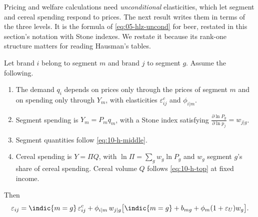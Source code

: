 Pricing and welfare calculations need \emph{unconditional} elasticities, which let segment and cereal
spending respond to prices. The next result writes them in terms of the three levels. It is the formula of
\eqref{eq:05-hlz-uncond} for beer, restated in this section's notation with Stone indexes. We restate it
because its rank-one structure matters for reading Hausman's tables.

\begin{proposition}\label{prop:10-elasticity-aggregation}
Let brand $i$ belong to segment $m$ and brand $j$ to segment $g$. Assume the following.
\begin{enumerate}[label=(\roman*)]
\item The demand $q_i$ depends on prices only through the prices of segment $m$ and on spending only through
$Y_m$, with elasticities $\varepsilon^c_{ij}$ and $\phi_{i|m}$.
\item Segment spending is $Y_m = P_mq_m$, with a Stone index satisfying
$\frac{\partial\ln P_g}{\partial\ln p_j} = w_{j|g}$.
\item Segment quantities follow \eqref{eq:10-h-middle}.
\item Cereal spending is $Y = \Pi Q$, with $\ln\Pi = \sum_g w_g\ln P_g$ and $w_g$ segment $g$'s share of cereal
spending. Cereal volume $Q$ follows \eqref{eq:10-h-top} at fixed income.
\end{enumerate}
Then
\begin{equation}\label{eq:10-elasticity-aggregation}
  \varepsilon_{ij} = \indic\{m = g\}\,\varepsilon^c_{ij}
  + \phi_{i|m}\,w_{j|g}\bigl[\indic\{m = g\} + b_{mg} + \phi_m(1 + \varepsilon_U)w_g\bigr].
\end{equation}
\end{proposition}

